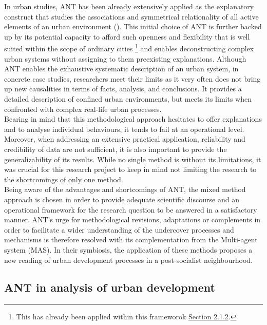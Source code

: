 \documentclass[11pt]{report}
\begin{document}
{{{{In urban studies, ANT has been already extensively applied as the explanatory construct that studies the associations and symmetrical relationality of all active elements of an urban environment (\href{Farias}{\citealt{farias_introduction:_2011}}).
This initial choice of ANT is further backed up by its
potential capacity to afford such openness and flexibility that is well suited within the scope of ordinary cities
\footnote{This has already been applied within this frameworok \href{Section 2.1.2}{Section 2.1.2}.} 
and enables deconstructing complex urban systems without assigning to them preexisting explanations.
Although ANT enables the exhaustive systematic description of an urban system, in concrete case studies, researchers meet their limits as it very often does not bring up new causalities in terms of facts, analysis, and conclusions. It provides a detailed description of confined urban environments, but meets its limits when confronted with complex real-life urban processes.
\\

Bearing in mind that this methodological approach hesitates to offer explanations and to analyse individual behaviours, it tends to fail at an operational level.
Moreover, when addressing an extensive practical application, reliability and credibility of data are not sufficient, it is also important to provide the generalizability of its results.
While no single method is without its limitations, it was crucial for this research project to keep in mind not limiting the research to the shortcomings of only one method.
\\

Being aware of the advantages and shortcomings of ANT, the mixed method approach is chosen in order to provide adequate scientific discourse and an operational framework for the research question to be answered in a satisfactory manner.
ANT's urge for methodological revisions, adaptations or complements in order to facilitate a wider understanding of the undercover processes and mechanisms is therefore resolved with its complementation from the Multi-agent system (MAS).
In their symbiosis, the application of these methods proposes a new reading of urban development processes in a post-socialist neighbourhood.

\subsection{ANT in analysis of urban development}

}}}}
\end{document}
